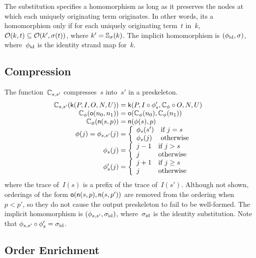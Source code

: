 \documentclass[12pt]{report}
\theoremstyle{definition}
\begin{document}
The substitution specifies a homomorphism as long as it preserves the
nodes at which each uniquely originating term originates.  In other
words, its a homomorphism only if for each uniquely originating
term~$t$ in~$k$, $\mathcal{O}(k,t)\subseteq\mathcal{O}(k', \sigma(t))$, where
$k'=\mathbb S_\sigma(k)$.  The implicit homomorphism is
$(\phi_{\mathrm{id}},\sigma)$, where~$\phi_{\mathrm{id}}$ is the identity strand map for~$k$.

\subsection{Compression}

The function~$\mathbb C_{s,s'}$ compresses~$s$ into~$s'$ in a preskeleton.
$$
\begin{array}{r@{}c@{}l}
\ops{C}_{s,s'}(\cn{k}(P, I, O, N, U))&{}={}&
\cn{k}(P, I\circ\phi'_s, \ops{C}_{\phi}\circ O, N, U)\\
\ops{C}_\phi(\cn{o}(n_0, n_1))&{}={}
&\cn{o}(\ops{C}_\phi(n_0), \ops{C}_\phi(n_1))\\
\ops{C}_\phi(\cn{n}(s, p))&{}={}&\cn{n}(\phi(s), p)\\
\phi(j)=\phi_{s,s'}(j)&{}={}&\left\{
\begin{array}{ll}
\phi_s(s')&\mbox{if $j=s$}\\
\phi_s(j)&\mbox{otherwise}
\end{array}\right.\\
\phi_s(j)&{}={}&\left\{
\begin{array}{ll}
j-1&\mbox{if $j>s$}\\
j&\mbox{otherwise}
\end{array}\right.\\
\phi'_s(j)&{}={}&\left\{
\begin{array}{ll}
j+1&\mbox{if $j\geq s$}\\
j&\mbox{otherwise}
\end{array}\right.
\end{array}
$$ where the trace of~$I(s)$ is a prefix of the trace of~$I(s')$.
Although not shown, orderings of the form
$\operatorname{\mathsf{o}}(\operatorname{\mathsf{n}}(s,p),\operatorname{\mathsf{n}}(s,p'))$ are removed from the ordering when
$p<p'$, so they do not cause the output preskeleton to fail to be
well-formed.  The implicit homomorphism is
$(\phi_{s,s'},\sigma_{\mathrm{id}})$, where~$\sigma_{\mathrm{id}}$ is the identity
substitution.  Note that $\phi_{s,s'}\circ\phi'_s=\sigma_{\mathrm{id}}$.

\subsection{Order Enrichment}
\end{document}
